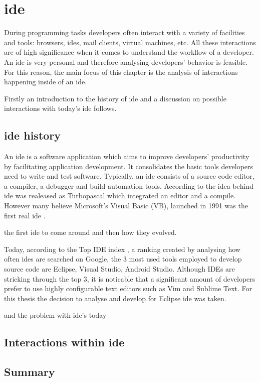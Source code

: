 \chapter{\gls{ide}}\label{cha:IDEs}

During programming tasks developers often interact with a variety of facilities and tools: browsers, \gls{ide}s, mail clients, virtual machines, etc. All these interactions are of high significance when it comes to understand the workflow of a developer. An \gls{ide} is very personal and therefore analysing developers' behavior is feasible. For this reason, the main focus of this chapter is the analysis of interactions happening inside of an \gls{ide}. 

Firstly an introduction to the history of \gls{ide} and a discussion on possible interactions with today's \gls{ide} follows.

\section{\gls{ide} history}

An \gls{ide} is a software application which aims to improve developers' productivity by facilitating application development. It consolidates the basic tools developers need to write and test software. Typically, an \gls{ide} consists of a source code editor, a compiler, a debugger and build automation tools. According to  the idea behind \gls{ide} was realeased as Turbopascal which integrated an editor and a compile. However many believe Microsoft's Visual Basic (VB), launched in 1991 was the first real \gls{ide}
.

the first ide to come around and then how they evolved.


Today, according to the Top IDE index , a ranking created by analysing how often \gls{ide}s are searched on Google, the 3 most used tools employed to develop source code are Eclipse, Visual Studio, Android Studio. Although \gls{IDE}s are stricking through the top 3, it is noticable that a significant amount of developers prefer to use highly configurable text editors such as Vim and Sublime Text. For this thesis the decision to analyse and develop for Eclipse \gls{ide} was taken.

and the problem with ide's today

\section{Interactions within \gls{ide}}
\section{Summary}